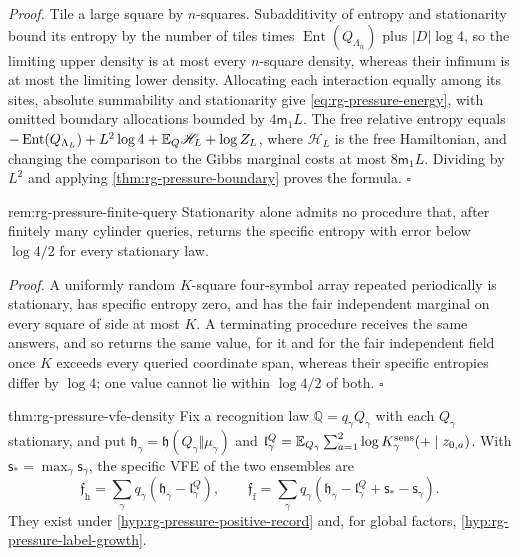 \noindent\emph{Proof.}
Tile a large square by $n$-squares. Subadditivity of entropy and
stationarity bound its entropy by the number of tiles times
$\operatorname{Ent}(Q_{\Lambda_n})$ plus $|D|\log4$, so the limiting upper density is at most
every $n$-square density, whereas their infimum is at most the limiting
lower density. Allocating each interaction equally among its sites,
absolute summability and stationarity give \cref{eq:rg-pressure-energy},
with omitted boundary allocations bounded by $4\mathsf m_1L$. The free
relative entropy equals
$-\operatorname{Ent}(Q_{\Lambda_L})+L^2\log4+\mathbb E_Q\mathscr H_L+\log Z_L$, where
$\mathscr H_L$ is the free Hamiltonian, and changing
the comparison to the Gibbs marginal costs at most $8\mathsf m_1L$. Dividing
by $L^2$ and applying \cref{thm:rg-pressure-boundary} proves the formula.
$\square$

{rem:rg-pressure-finite-query}
Stationarity alone admits no procedure that, after finitely many cylinder
queries, returns the specific entropy with error below $\log4/2$ for every
stationary law. 

\noindent\emph{Proof.}
A uniformly random $K$-square four-symbol array repeated periodically is
stationary, has specific entropy zero, and has the fair independent marginal
on every square of side at most $K$. A terminating procedure receives the same
answers, and so returns the same value, for it and for the fair independent
field once $K$ exceeds every queried coordinate span, whereas their specific
entropies differ by $\log4$; one value cannot lie within $\log4/2$ of both.
$\square$

{thm:rg-pressure-vfe-density}
Fix a recognition law $\mathbb Q=q_\gamma Q_\gamma$ with each $Q_\gamma$
stationary, and put $\mathfrak h_\gamma=\mathfrak h(Q_\gamma\Vert\mu_\gamma)$
and $\mathfrak l^Q_\gamma=\mathbb E_{Q_\gamma}\sum_{a=1}^2
\log K^{\mathrm{sens}}_\gamma(+\mid z_{0,a})$. With
$\mathsf s_*=\max_\gamma\mathsf s_\gamma$, the specific VFE of the two
ensembles are
\begin{equation}
 \mathfrak f_{\mathrm h}=\sum_\gamma q_\gamma(\mathfrak h_\gamma-\mathfrak l_\gamma^Q),\qquad
 \mathfrak f_{\mathrm f}=\sum_\gamma q_\gamma
       (\mathfrak h_\gamma-\mathfrak l_\gamma^Q+\mathsf s_*-\mathsf s_\gamma).
 \label{eq:rg-pressure-vfe-density}
\end{equation}
They exist under \cref{hyp:rg-pressure-positive-record} and, for global
factors, \cref{hyp:rg-pressure-label-growth}. 

